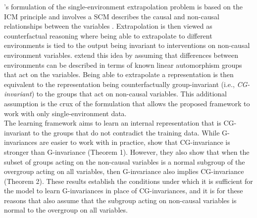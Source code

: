 \citeauthor{Mouli:2021}'s formulation of the single-environment extrapolation problem is based on the ICM principle and involves a SCM describes the causal and non-causal relationships between the variables \parencite{Scholkopf:2019}. Extrapolation is then viewed as counterfactual reasoning where being able to extrapolate to different environments is tied to the output being invariant to interventions on non-causal environment variables. \citeauthor{Mouli:2021} extend this idea by assuming that differences between environments can be described in terms of known linear automorphism groups that act on the variables. Being able to extrapolate a representation is then equivalent to the representation being counterfactually group-invariant (i.e., \textit{CG-invariant}) to the groups that act on non-causal variables. This additional assumption is the crux of the formulation that allows the proposed framework to work with only single-environment data.
\\

The learning framework aims to learn an internal representation that is CG-invariant to the groups that do not contradict the training data. While G-invariances are easier to work with in practice, \textcite{Mouli:2021} show that CG-invariance is stronger than G-invariance (Theorem 1). However, they also show that when the subset of groups acting on the non-causal variables is a normal subgroup of the overgroup acting on all variables, then G-invariance also implies CG-invariance (Theorem 2). These results establish the conditions under which it is sufficient for the model to learn G-invariances in place of CG-invariances, and it is for these reasons that \citeauthor{Mouli:2021} also assume that the subgroup acting on non-causal variables is normal to the overgroup on all variables.
\\

